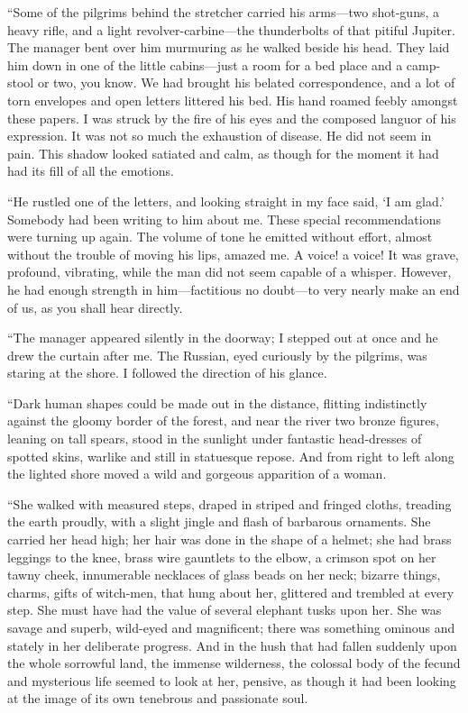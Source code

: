 \documentclass[12pt]{report}
\begin{document}
``Some of the pilgrims behind the stretcher carried his arms---two
shot-guns, a heavy rifle, and a light revolver-carbine---the
thunderbolts of that pitiful Jupiter. The manager bent over him
murmuring as he walked beside his head. They laid him down in one of the
little cabins---just a room for a bed place and a camp-stool or two, you
know. We had brought his belated correspondence, and a lot of torn
envelopes and open letters littered his bed. His hand roamed feebly
amongst these papers. I was struck by the fire of his eyes and the
composed languor of his expression. It was not so much the exhaustion of
disease. He did not seem in pain. This shadow looked satiated and calm,
as though for the moment it had had its fill of all the emotions.

``He rustled one of the letters, and looking straight in my face said,
`I am glad.' Somebody had been writing to him about me. These special
recommendations were turning up again. The volume of tone he emitted
without effort, almost without the trouble of moving his lips, amazed
me. A voice! a voice! It was grave, profound, vibrating, while the man
did not seem capable of a whisper. However, he had enough strength in
him---factitious no doubt---to very nearly make an end of us, as you
shall hear directly.

``The manager appeared silently in the doorway; I stepped out at once
and he drew the curtain after me. The Russian, eyed curiously by the
pilgrims, was staring at the shore. I followed the direction of his
glance.

``Dark human shapes could be made out in the distance, flitting
indistinctly against the gloomy border of the forest, and near the river
two bronze figures, leaning on tall spears, stood in the sunlight under
fantastic head-dresses of spotted skins, warlike and still in statuesque
repose. And from right to left along the lighted shore moved a wild and
gorgeous apparition of a woman.

``She walked with measured steps, draped in striped and fringed cloths,
treading the earth proudly, with a slight jingle and flash of barbarous
ornaments. She carried her head high; her hair was done in the shape of
a helmet; she had brass leggings to the knee, brass wire gauntlets to
the elbow, a crimson spot on her tawny cheek, innumerable necklaces of
glass beads on her neck; bizarre things, charms, gifts of witch-men,
that hung about her, glittered and trembled at every step. She must have
had the value of several elephant tusks upon her. She was savage and
superb, wild-eyed and magnificent; there was something ominous and
stately in her deliberate progress. And in the hush that had fallen
suddenly upon the whole sorrowful land, the immense wilderness, the
colossal body of the fecund and mysterious life seemed to look at her,
pensive, as though it had been looking at the image of its own tenebrous
and passionate soul.
\end{document}
